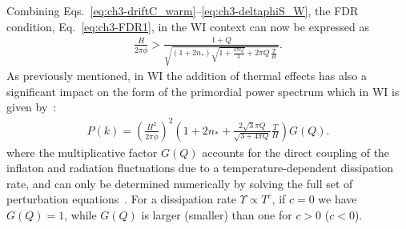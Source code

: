 Combining Eqs.~\ref{eq:ch3-driftC_warm}--\ref{eq:ch3-deltaphiS_W}, the FDR
condition, Eq.~\ref{eq:ch3-FDR1}, in the WI context can now be expressed
as
%
\begin{eqnarray}
    \frac{H}{2\pi
      \dot{\phi}}>\frac{1+Q}{\sqrt{(1+2n_*)\sqrt{1+\frac{4\pi
            Q}{3}}+2\pi Q \,\frac{T}{H}\, }}. \label{eq:ch3-FDR_warmv0}
\end{eqnarray}
As previously mentioned, in WI the addition of
thermal effects has also a significant impact on the form of the primordial power spectrum which in WI is given by~\cite{Kamali:2023lzq}:
%
\begin{eqnarray}
    P(k)=\left(\frac{H^{2}}{2 \pi \dot{\phi}}\right)^2\left(1 + 2
    n_{*}+\frac{2 \sqrt{3} \pi Q}{\sqrt{3+4 \pi Q}} \frac{T}{H}\right)
    G(Q).\label{eq:ch3-DeltaR_warm}
\end{eqnarray}
%
where the multiplicative factor $G(Q)$ accounts for the
direct coupling of the inflaton and radiation fluctuations due to a temperature-dependent dissipation rate, and can only be determined numerically by solving the full set of perturbation equations~\cite{Graham:2009bf, Bastero-Gil:2011rva,Montefalcone:2023pvh}. For a dissipation rate $\Upsilon\propto T^c$, if $c=0$ we have $G(Q)=1$, while $G(Q)$ is larger (smaller) than one for $c >0$ ($c<0$).

